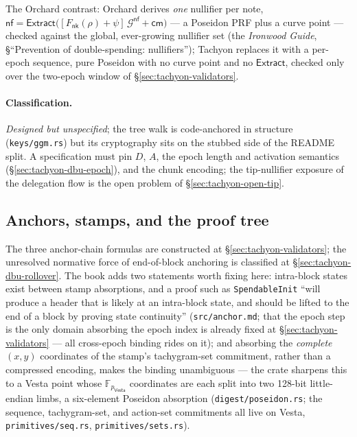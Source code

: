 \documentclass[11pt,a4paper]{article}
\theoremstyle{definition}
\newcommand{\F}{\mathbb{F}}
\newcommand{\nfsym}{\mathsf{nf}}
\newcommand{\cmsym}{\mathsf{cm}}
\newcommand{\Vesta}{\ensuremath{\mathsf{Vesta}}}
\newcommand{\Extract}{\ensuremath{\mathsf{Extract}}}
\newcommand{\nksym}{\ensuremath{\mathsf{nk}}}
\begin{document}
The Orchard contrast: Orchard derives \emph{one} nullifier per note,
$\nfsym = \Extract\bigl([F_{\nksym}(\rho) + \psi]\,\mathcal{G}^{\nfsym} +
\cmsym\bigr)$ --- a Poseidon PRF plus a curve point --- checked against the
global, ever-growing nullifier set (the \emph{Ironwood Guide},
\S``Prevention of double-spending: nullifiers''); Tachyon replaces it with
a per-epoch sequence, pure Poseidon with no curve point and no
$\Extract$, checked only over the two-epoch window of
\S\ref{sec:tachyon-validators}.

\paragraph{Classification.} \emph{Designed but unspecified}; the tree walk
is code-anchored in structure (\texttt{keys/ggm.rs}) but its cryptography
sits on the stubbed side of the README split. A specification must pin
$D$, $A$, the epoch length and activation semantics
(\S\ref{sec:tachyon-dbu-epoch}), and the chunk encoding; the tip-nullifier
exposure of the delegation flow is the open problem of
\S\ref{sec:tachyon-open-tip}.

\subsection{Anchors, stamps, and the proof tree}\label{sec:tachyon-design-tree}

The three anchor-chain formulas are constructed at
\S\ref{sec:tachyon-validators}; the unresolved normative force of
end-of-block anchoring is classified at \S\ref{sec:tachyon-dbu-rollover}.
The book adds two statements worth fixing here: intra-block states exist
between stamp absorptions, and a proof such as \texttt{SpendableInit}
``will produce a header that is likely at an intra-block state, and should
be lifted to the end of a block by proving state continuity''
(\texttt{src/anchor.md}; that the epoch step is the only domain absorbing
the epoch index is already fixed at \S\ref{sec:tachyon-validators} --- all
cross-epoch binding rides on it); and absorbing
the \emph{complete} $(x, y)$ coordinates of the stamp's tachygram-set
commitment, rather than a compressed encoding, makes the binding
unambiguous --- the crate sharpens this to a Vesta point whose
$\F_{p_{\Vesta}}$ coordinates are each split into two 128-bit
little-endian limbs, a six-element Poseidon absorption
(\texttt{digest/poseidon.rs}; the sequence, tachygram-set, and action-set
commitments all live on Vesta, \texttt{primitives/seq.rs},
\texttt{primitives/sets.rs}).
\end{document}
